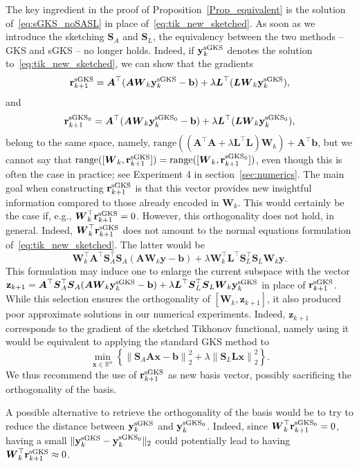 \documentclass[%
  a4paper,
  onecolumn,
  colorlinks,
]{preprint}
\theoremstyle{plain}
\theoremstyle{definition}
\newcommand{\R}{\ensuremath{\mathbb{R}}}
\newcommand{\norm}[1]{\left\|#1\right\|}
\newcommand{\bA}{\ensuremath{\boldsymbol{A}}}
\newcommand{\bL}{\ensuremath{\boldsymbol{L}}}
\newcommand{\bS}{\ensuremath{\boldsymbol{S}}}
\newcommand{\bW}{\ensuremath{\boldsymbol{W}}}
\newcommand{\bb}{\mathbf{b}}
\newcommand{\br}{\mathbf{r}}
\newcommand{\by}{\mathbf{y}}
\newcommand{\bx}{\mathbf{x}}
\newcommand{\bz}{\mathbf{z}}
\begin{document}
The key ingredient in the proof of Proposition~\ref{Prop_equivalent} is the solution of~\eqref{eq:sGKS_noSASL} in place of~\eqref{eq:tik_new_sketched}. As soon as we introduce the sketching $\bS_A$ and $\bS_L$, the equivalency between the two methods -- GKS and sGKS -- no longer holds. 
Indeed, if $\by_k^{\rm sGKS}$ denotes the solution to~\eqref{eq:tik_new_sketched}, we can show that the gradients
$$\br_{k+1}^{\rm sGKS}=\bA^\top(\bA\bW_{k}\by_k^{\rm sGKS} - \bb)
         + \lambda\bL^\top(\bL\bW_{k}\by_k^{\rm sGKS}),$$
and 
$$\br_{k+1}^{\rm sGKS_0}=\bA^\top(\bA\bW_{k}\by_k^{\rm sGKS_0} - \bb)
         + \lambda\bL^\top(\bL\bW_{k}\by_k^{\rm sGKS_0}),$$
 belong to the same space, namely, 
$\text{range}((\bA^\top\bA+\lambda\bL^\top\bL)\bW_{k}         )+\bA^\top \bb$, but we cannot say that 
$\text{range}([\bW_k,\br_{k+1}^{\rm sGKS}])= \text{range}([\bW_k,\br_{k+1}^{\rm sGKS_0}])$, even though this is often the case in practice; see Experiment 4 in section~\ref{sec:numerics}. 
The main goal when constructing 
$\br_{k+1}^{\rm sGKS}$ is that this vector provides new insightful information compared to those already encoded in $\bW_k$.
This would certainly be the case if, e.g., $\bW_k^\top \br_{k+1}^{\rm sGKS}=0$. However, this orthogonality does not hold, in general. Indeed, $\bW_k^\top \br_{k+1}^{\rm sGKS}$ does not amount to the normal equations formulation of~\eqref{eq:tik_new_sketched}. The latter would be 
$$\bW_k^\top\bA^\top\bS_A^\top \bS_A(\bA\bW_k\by-\bb)+\lambda\bW_k^\top\bL^\top \bS_L^\top \bS_L\bW_k\by.$$
This formulation may induce one to enlarge the current subspace with the vector 
$\bz_{k+1}=\bA^\top\bS_A^\top \bS_A(\bA\bW_k\by_k^{\rm sGKS}-\bb)+\lambda\bL^\top \bS_L^\top \bS_L\bW_k\by_k^{\rm sGKS}$ in place of $\br_{k+1}^{\rm sGKS}$. While this selection ensures the orthogonality of $[\bW_k,\bz_{k+1}]$, it also produced poor approximate solutions in our numerical experiments.
Indeed, $\bz_{k+1}$ corresponds to the gradient of the sketched Tikhonov functional, namely using it would be equivalent to applying the standard GKS method to 
$$  \min_{\bx \in \R^n} \left\{ \norm{\bS_A\bA\bx - \bb}_2^2 + \lambda\norm{\bS_L\bL\bx}_2^2 \right\}.$$
We thus recommend the use of $\br_{k+1}^{\rm sGKS}$ as new basis vector, possibly sacrificing the orthogonality of the basis. 

A possible alternative to retrieve the orthogonality of the basis would be to try to reduce the distance between $\by_k^{\rm sGKS}$ and $\by_k^{\rm sGKS_0}$. Indeed, since $\bW_k^\top\br_{k+1}^{\rm sGKS_0}=0$, having a small $\|\by_k^{\rm sGKS}-\by_k^{\rm sGKS_0}\|_2$ could potentially lead to having 
$\bW_k^\top\br_{k+1}^{\rm sGKS}\approx 0$.
 
\end{document}

